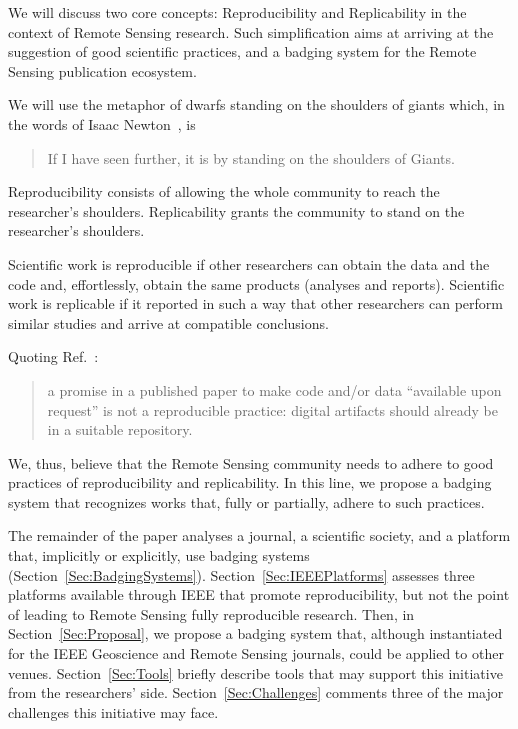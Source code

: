 \documentclass[journal,twoside]{IEEEtran}
\begin{document}
We will discuss two core concepts: Reproducibility and Replicability in the context of Remote Sensing research.
Such simplification aims at arriving at the suggestion of good scientific practices, and a badging system for the Remote Sensing publication ecosystem.

We will use the metaphor of dwarfs standing on the shoulders of giants which, in the words of Isaac Newton~\cite{LetterNewton}, is
\begin{quote}
	If I have seen further, it is by standing on the shoulders of Giants.
\end{quote}
Reproducibility consists of allowing the whole community to reach the researcher's shoulders.
Replicability grants the community to stand on the researcher's shoulders.

Scientific work is reproducible if other researchers can obtain the data and the code and, effortlessly, obtain the same products (analyses and reports).
Scientific work is replicable if it reported in such a way that other researchers can perform similar studies and arrive at compatible conclusions.

Quoting Ref.~\cite{PraxisofReproducibleComputationalScience}:
\begin{quote}
	a promise in a published paper
	to make code and/or data ``available upon
	request'' is not a reproducible practice: digital
	artifacts should already be in a suitable repository.
\end{quote}

We, thus, believe that the Remote Sensing community needs to adhere to good practices of reproducibility and replicability.
In this line, we propose a badging system that recognizes works that, fully or partially, adhere to such practices.

The remainder of the paper analyses a journal, a scientific society, and a platform that, implicitly or explicitly, use badging systems (Section~\ref{Sec:BadgingSystems}).
Section~\ref{Sec:IEEEPlatforms} assesses three platforms available through IEEE that promote reproducibility, but not the point of leading to Remote Sensing fully reproducible research.
Then, in Section~\ref{Sec:Proposal}, we propose a badging system that, although instantiated for the IEEE Geoscience and Remote Sensing journals, could be applied to other venues.
Section~\ref{Sec:Tools} briefly describe tools that may support this initiative from the researchers' side.
Section~\ref{Sec:Challenges} comments three of the major challenges this initiative may face.
\end{document}
